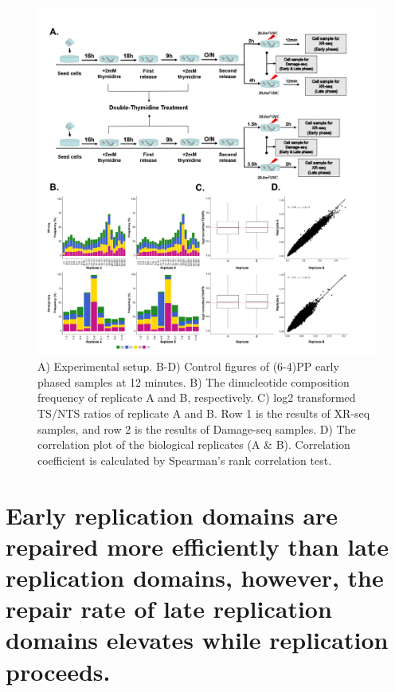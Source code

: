 \shorthandoff{=}
\begin{figure}[H]
    \begin{center}
    \includegraphics[width=\textwidth]{Chapters/4_results/figures/fig1}
    \caption[Experimental setup.]{A) Experimental setup. B-D) Control figures of (6-4)PP early phased samples at 12 minutes. B) The dinucleotide composition frequency of replicate A and B, respectively. C) log2 transformed TS/NTS ratios of replicate A and B. Row 1 is the results of XR-seq samples, and row 2 is the results of Damage-seq samples. D) The correlation plot of the biological replicates (A \& B). Correlation coefficient is calculated by Spearman’s rank correlation test.}
    \label{fig:intro}
    \end{center}
    \end{figure}


\section{Early replication domains are repaired more efficiently than late replication domains, however, the repair rate of late replication domains elevates while replication proceeds.}

